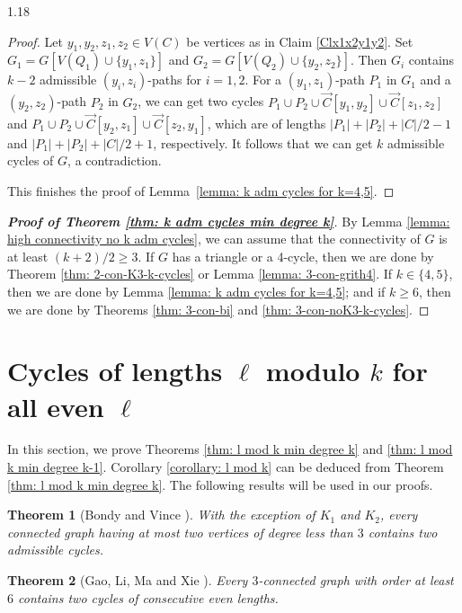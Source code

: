\documentclass[10pt]{article}
\newtheorem{theorem}{Theorem}[section]
\begin{document}
\begin{spacing}{1.18}
\begin{proof}
Let $y_1,y_2,z_1,z_2\in V(C)$ be vertices as in Claim \ref{Clx1x2y1y2}. Set $G_1=G[V(Q_1)\cup\{y_1,z_1\}]$ and $G_2=G[V(Q_2)\cup\{y_2,z_2\}]$. Then $G_i$ contains $k-2$ admissible $(y_i,z_i)$-paths for $i=1,2$. For a $(y_1,z_1)$-path $P_1$ in $G_1$ and a $(y_2,z_2)$-path $P_2$ in $G_2$, we can get two cycles $P_1\cup P_2\cup\overrightarrow{C}[y_1,y_2]\cup\overrightarrow{C}[z_1,z_2]$ and $P_1\cup P_2\cup\overrightarrow{C}[y_2,z_1]\cup\overrightarrow{C}[z_2,y_1]$, which are of lengths $|P_1|+|P_2|+|C|/2-1$ and $|P_1|+|P_2|+|C|/2+1$, respectively. It follows that we can get $k$ admissible cycles of $G$, a contradiction. 

This finishes the proof of Lemma~\ref{lemma: k adm cycles for k=4,5}.
\end{proof}


\begin{proof}[\bf Proof of Theorem \ref{thm: k adm cycles min degree k}]
    By Lemma \ref{lemma: high connectivity no k adm cycles}, we can assume that the connectivity of $G$ is at least $(k+2)/2\geqslant 3$. If $G$ has a triangle or a 4-cycle, then we are done by Theorem \ref{thm: 2-con-K3-k-cycles} or Lemma \ref{lemma: 3-con-grith4}. If $k\in\{4,5\}$, then we are done by Lemma \ref{lemma: k adm cycles for k=4,5}; and if $k\geqslant 6$, then we are done by Theorems \ref{thm: 3-con-bi} and \ref{thm: 3-con-noK3-k-cycles}.
\end{proof}


\section{Cycles of lengths $\ell$ modulo $k$ for all even $\ell$}\label{section: even ell}

In this section, we prove Theorems \ref{thm: l mod k min degree k} and \ref{thm: l mod k min degree k-1}. Corollary \ref{corollary: l mod k} can be deduced from Theorem \ref{thm: l mod k min degree k}. The following results will be used in our proofs.

\begin{theorem}[Bondy and Vince \cite{BV98}]\label{thm: 2 adm cycles}
    With the exception of $K_1$ and $K_2$, every connected graph having at most two vertices of degree less than $3$ contains two admissible cycles.
\end{theorem}

\begin{theorem}[Gao, Li, Ma and Xie \cite{GLMX}]\label{thm: 3-con-2-consecutive-even-cycles}
    Every $3$-connected graph with order at least $6$ contains two cycles of consecutive even lengths.
\end{theorem}


\end{spacing}
\end{document}
